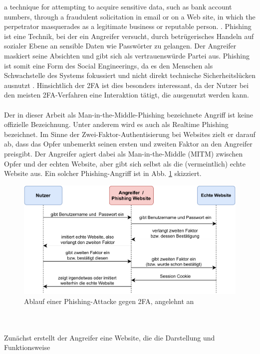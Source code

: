 \glqq [Phishing is] a technique for attempting to acquire sensitive data, such as bank 
account numbers, through a fraudulent solicitation in email or on a Web site, in 
which the perpetrator masquerades as a legitimate business or reputable person.\grqq{} 
\autocite[222]{rfc4949}. Phishing ist eine Technik, bei der ein Angreifer versucht, durch betrügerisches Handeln auf sozialer Ebene an sensible Daten wie Passwörter zu gelangen. Der Angreifer maskiert seine Absichten und gibt sich als vertrauenswürde Partei aus. Phishing ist somit eine Form des Social Engineerings, da es 
den Menschen als Schwachstelle des Systems fokussiert und nicht direkt technische 
Sicherheitslücken ausnutzt \autocite{bsiSocialEng}. Hinsichtlich der 2FA ist dies besonders interessant, da der Nutzer bei den meisten 2FA-Verfahren eine Interaktion tätigt, die ausgenutzt werden kann.
\\\\
Der in dieser Arbeit als Man-in-the-Middle-Phishing bezeichnete Angriff ist keine 
offizielle Bezeichnung. Unter anderem wird es auch als Realtime Phishing bezeichnet. Im Sinne der 
Zwei-Faktor-Authentisierung bei Websites zielt er darauf ab, dass das Opfer 
unbemerkt seinen ersten und zweiten Faktor an den Angreifer preisgibt. Der Angreifer 
agiert dabei als Man-in-the-Middle (MITM) zwischen Opfer und der echten Website, 
aber gibt sich selbst als die (vermeintlich) echte Website aus. Ein solcher Phishing-Angriff ist in 
Abb. \ref{fig: mitm phishing} skizziert.
\begin{figure}
    \centering
    \includegraphics[width=.9\linewidth]{figures/mitmPhishing.pdf}
    \caption[Ablauf einer Phishing-Attacke gegen 2FA]{Ablauf einer Phishing-Attacke gegen 2FA, angelehnt an \autocite[Abb. 1]{Srinivasan}}
    \label{fig: mitm phishing}
\end{figure}
\\\\
Zunächst erstellt der Angreifer eine Website, die die Darstellung und Funktionsweise 
